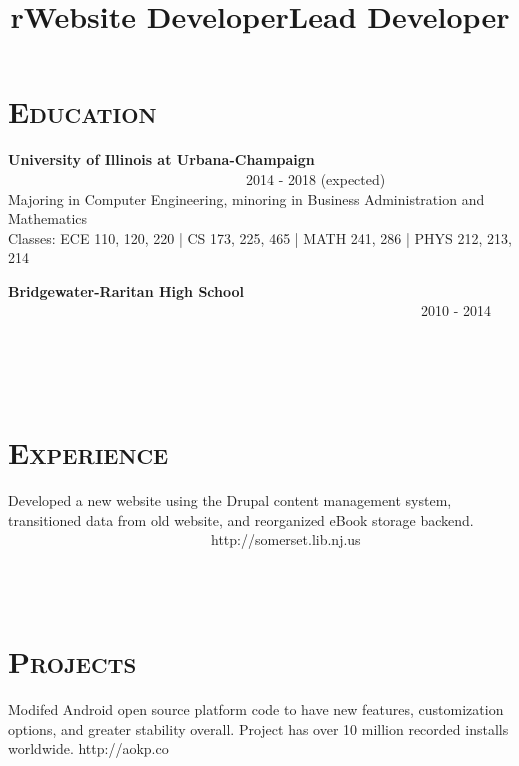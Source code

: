 \begin{resume}
\section{\textsc{Education}}
\textbf{University of Illinois at Urbana-Champaign} \ \ \ \ \ \ \ \ \ \ \ \ \ \ \ \ \ \ \ \ \ \ \ \ \ \ \ \ \ \ \ \ \ \ 2014 - 2018 (expected) \\
Majoring in Computer Engineering, minoring in Business Administration and Mathematics \\
Classes: ECE 110, 120, 220 | CS 173, 225, 465 | MATH 241, 286 | PHYS 212, 213, 214

\textbf{Bridgewater-Raritan High School} \ \ \ \ \ \ \ \ \ \ \ \ \ \ \ \ \ \ \ \ \ \ \ \ \ \ \ \ \ \ \ \ \ \ \ \ \ \ \ \ \ \ \ \ \ \ \ \ \ \ \ \ \ \ \ \ \ \ \ 2010 - 2014

\begin{formatb}
  \title{r}\\
  \\
  \body\\
\end{formatb}

\section{\textsc{Experience}}

\title{Website Developer}
\begin{position}
Developed a new website using the Drupal content management system, transitioned data from old website, and reorganized eBook storage backend. \ \ \ \ \ \ \ \ \ \ \ \ \ \ \ \ \ \ \ \ \ \ \ \ \ \ \ \ \ http://somerset.lib.nj.us
\end{position}

\begin{formatb}
  \\
  \body\\
\end{formatb}

\section{\textsc{Projects}}

\title{Lead Developer}
\begin{position}
Modifed Android open source platform code to have new features, customization options, and greater stability overall. Project has over 10 million recorded installs worldwide. http://aokp.co
\end{position}


\end{resume}
